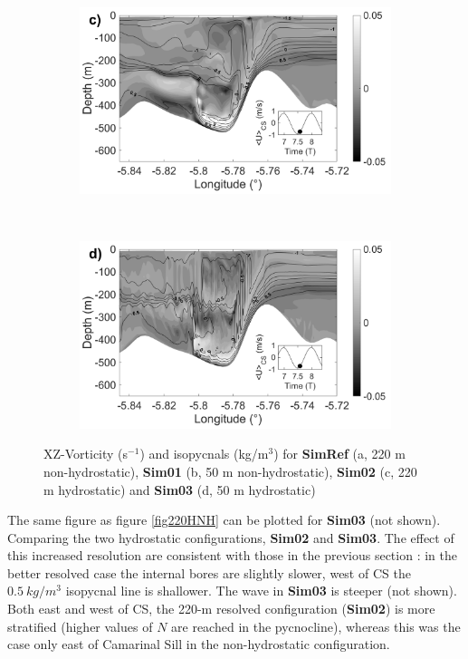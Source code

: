 \documentclass[a4paper,12pt]{article}
\begin{document}
\begin{figure}[!h]
  \begin{subfigure}{0.5\linewidth}
  \includegraphics[width=\textwidth]{RV_75T_220mH.png}
  \end{subfigure}
  ~
  \begin{subfigure}{0.5\linewidth}
  \includegraphics[width=\textwidth]{RV_75T_50mH.png}
  \end{subfigure}
  \caption{XZ-Vorticity (s$^{-1}$) and isopycnals (kg/m$^3$) for \textbf{SimRef} (a, 220 m non-hydrostatic), \textbf{Sim01} (b, 50 m non-hydrostatic), \textbf{Sim02} (c, 220 m hydrostatic) and \textbf{Sim03} (d, 50 m hydrostatic)}
  \label{figvortCS}
\end{figure}

The same figure as figure \ref{fig220HNH} can be plotted for \textbf{Sim03} (not shown). Comparing the two hydrostatic configurations, \textbf{Sim02} and \textbf{Sim03}. The effect of this increased resolution are consistent with those in the previous section : in the better resolved case the internal bores are slightly slower, west of CS the $0.5\ kg/m^3$ isopycnal line is shallower. The wave in \textbf{Sim03} is steeper (not shown). Both east and west of CS, the 220-m resolved configuration (\textbf{Sim02}) is more stratified (higher values of $N$ are reached in the pycnocline), whereas this was the case only east of Camarinal Sill in the non-hydrostatic configuration.
\end{document}
